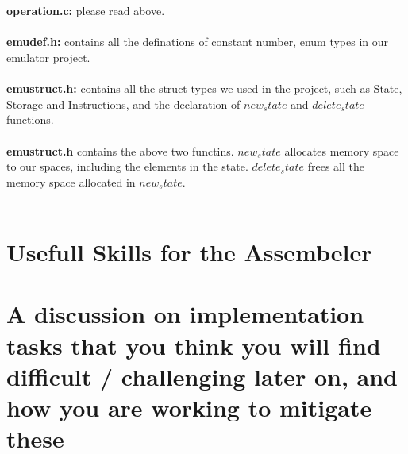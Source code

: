 \documentclass[a4paper]{article}
\begin{document}
\\\\
\textbf{operation.c:} please read above.
\\\\
\textbf{emudef.h:} contains all the definations of constant number, enum types in our emulator project.
\\\\
\textbf{emustruct.h:} contains all the struct types we used in the project, such as State, Storage and Instructions, and the declaration of $new_state$ and $delete_state$ functions.
\\\\
\textbf{emustruct.h} contains the above two functins. $new_state$ allocates memory space to our spaces, including the elements in the state. $delete_state$ frees all the memory space allocated in $new_state$.
\\\\


\section{Usefull Skills for the Assembeler}

\section{A discussion on implementation tasks that you think you will find difficult / challenging later on,
and how you are working to mitigate these}
\end{document}
